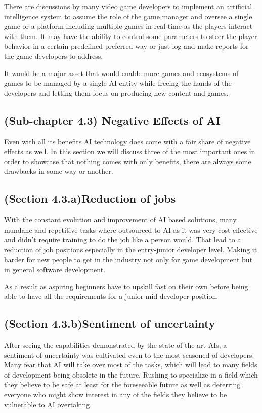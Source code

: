 \documentclass[a4paper,one side,12pt]{book}
\begin{document}
There are discussions by many video game developers to implement an
artificial intelligence system to assume the role of the game manager
and oversee a single game or a platform including multiple games in real
time as the players interact with them. It may have the ability to
control some parameters to steer the player behavior in a certain
predefined preferred way or just log and make reports for the game
developers to address.

It would be a major asset that would enable more games and ecosystems of
games to be managed by a single AI entity while freeing the hands of the
developers and letting them focus on producing new content and games.

\subsection{(Sub-chapter 4.3) Negative Effects of AI}

Even with all its benefits AI technology does come with a fair share of negative effects as well.
In this section we will discuss three of the most important ones in order to showcase that 
nothing comes with only benefits, there are always some drawbacks in some way or another.

\subsection{(Section 4.3.a)Reduction of jobs}

With the constant evolution and improvement of AI based solutions,
many mundane and repetitive tasks where outsourced to AI as it was 
very cost effective and didn't require training to do the job like a
person would. 
That lead to a reduction of job positions especially in the entry-junior 
developer level. Making it harder for new people to get in the industry not 
only for game development but in general software development.

As a result as aspiring beginners have to upskill fast on their own before 
being able to have all the requirements for a junior-mid developer position.
  
  
\subsection{(Section 4.3.b)Sentiment of uncertainty}

After seeing the capabilities demonstrated by the state of the art AIs,
a sentiment of uncertainty was cultivated even to the most seasoned of developers.
Many fear that AI will take over most of the tasks, which will lead to many fields of
development being obsolete in the future. Rushing to specialize in a field which they 
believe to be safe at least for the foreseeable future as well as deterring everyone who
might show interest in any of the fields they believe to be vulnerable to AI overtaking.
\end{document}
